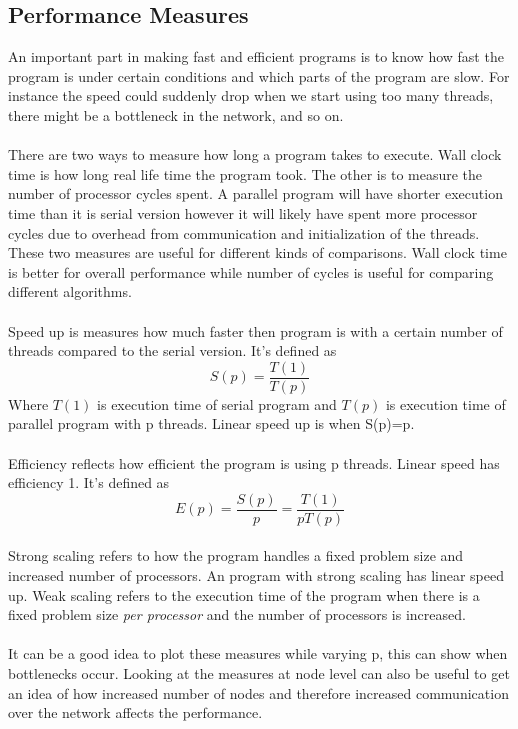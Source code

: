 \documentclass[10pt,a4paper]{report}
\begin{document}
\clearpage
\subsection{Performance Measures}
An important part in making fast and efficient programs is to know how fast the program is under certain conditions and which parts of the program are slow\cite{introduction_hpc_hager}. For instance the speed could suddenly drop when we start using too many threads, there might be a bottleneck in the network, and so on.\\
\\
There are two ways to measure how long a program takes to execute\cite{introduction_hpc_hager}. Wall clock time is how long real life time the program took. The other is to measure the number of processor cycles spent. A parallel program will have shorter execution time than it is serial version however it will likely have spent more processor cycles due to overhead from communication and initialization of the threads. These two measures are useful for different kinds of comparisons. Wall clock time is better for overall performance while number of cycles is useful for comparing different algorithms\cite{introduction_hpc_hager, cuda_best_practice}.\\
\\
Speed up is measures how much faster then program is with a certain number of threads compared to the serial version. It's defined as\cite{introduction_hpc_hager}
$$S(p)=\frac{T(1)}{T(p)}$$
Where $T(1)$ is execution time of serial program and $T(p)$ is execution time of parallel program with p threads. Linear speed up is when S(p)=p\cite{introduction_hpc_hager}.\\
\\
Efficiency reflects how efficient the program is using p threads. Linear speed has efficiency 1. It's defined as\cite{introduction_hpc_hager}
$$E(p)=\frac{S(p)}{p}=\frac{T(1)}{pT(p)}$$
\\
Strong scaling refers to how the program handles a fixed problem size and increased number of processors\cite{introduction_hpc_hager}. An program with strong scaling has linear speed up\cite{introduction_hpc_hager}. Weak scaling refers to the execution time of the program when there is a fixed problem size \emph{per processor} and the number of processors is increased\cite{introduction_hpc_hager, cuda_best_practice}.\\
\\
It can be a good idea to plot these measures while varying p, this can show when bottlenecks occur. Looking at the measures at node level can also be useful to get an idea of how increased number of nodes and therefore increased communication over the network affects the performance.
\end{document}
